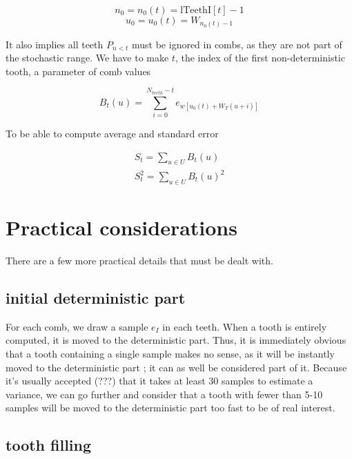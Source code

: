 \documentclass[./thesis.tex]{subfiles}
\newcommand{\lTeethI}{\text{lTeethI}}
\begin{document}
$$n_0 = n_0(t) = \lTeethI[t]-1$$
$$u_0 = u_0(t) = W_{n_0(t) -1}$$

It also implies all teeth $P_{n<t}$ must be ignored in combs, as they are not part of the stochastic range. We have to make $t$, the index of the first non-deterministic tooth, a parameter of comb values

\begin{equation}
B_t(u) = \sum_{i=0}^{N_{teeth}-t} e_{w[u_0(t)+ W_T(u+i)]}
\end{equation}

To be able to compute average and standard error 

\begin{align}
 S_t = \sum_{u \in {U}} B_t(u) \\
 S^2_t = \sum_{u \in {U}} B_t(u)^2
\end{align}


\section{Practical considerations}

There are a few more practical details that must be dealt with.

\subsection*{initial deterministic part}

For each comb, we draw a sample $e_I$ in each teeth. When a tooth is entirely computed, it is moved to the deterministic part. Thus, it is immediately obvious that a tooth containing a single sample makes no sense, as it will be instantly moved to the deterministic part ; it can as well be considered part of it. Because it's usually accepted (???) that it takes at least 30 samples to estimate a variance, we can go further and consider that a tooth with fewer than 5-10 samples will be moved to the deterministic part too fast to be of real interest.


\subsection*{tooth filling}
\end{document}

